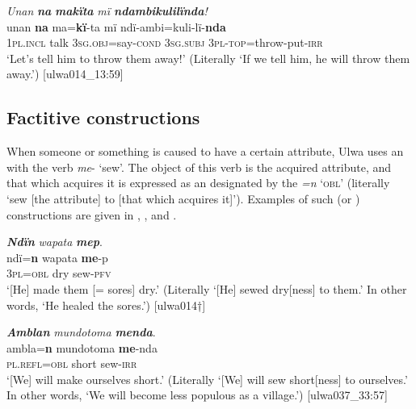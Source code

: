 \ea%
    \label{ex:syntax:359}
          \textit{Unan} \textbf{\textit{na}} \textbf{\textit{makïta}} \textit{mï \textbf{ndambikulilïnda}!}\\
\gll    unan    \textbf{na}    ma=\textbf{kï}{}-ta        mï ndï-ambi=kuli-lï-\textbf{nda}\\
    1\textsc{pl.incl}  talk  3\textsc{sg.obj}=say\textsc{{}-cond}  \textsc{3sg.subj}    \textsc{3pl-top=}throw-put-\textsc{irr}\\
\glt `Let’s tell him to throw them away!’ (Literally ‘If we tell him, he will throw them away.’) [ulwa014\_13:59]
\z

\subsection{Factitive constructions}\label{sec:13.9.3}


When someone or something is caused to have a certain attribute, Ulwa uses an  with the verb \textit{me}{}- ‘sew’. The object of this verb is the acquired attribute, and that which acquires it is expressed as an   designated by the  \textit{=n} ‘\textsc{obl}’ (literally ‘sew [the attribute] to [that which acquires it]’). Examples of such  (or ) constructions are given in , , and .

\ea%
    \label{ex:syntax:360}
          \textbf{\textit{Ndïn}} \textit{wapata} \textbf{\textit{mep}}.\\
\gll ndï=\textbf{n}    wapata  \textbf{me}{}-p\\
    3\textsc{pl=obl}  dry    sew-\textsc{pfv}\\
\glt `[He] made them [= sores] dry.’ (Literally ‘[He] sewed dry[ness] to them.’ In other words, ‘He healed the sores.’) [ulwa014†]
\z

\newpage

\ea%
    \label{ex:syntax:361}
          \textbf{\textit{Amblan}} \textit{mundotoma} \textbf{\textit{menda}}.\\
\gll ambla=\textbf{n}    mundotoma  \textbf{me}{}-nda\\
    \textsc{pl.refl=obl}  short      sew-\textsc{irr}\\
\glt `[We] will make ourselves short.’ (Literally ‘[We] will sew short[ness] to ourselves.’ In other words, ‘We will become less populous as a village.’) [ulwa037\_33:57]
\z

